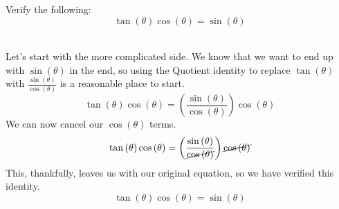 \documentclass{ximera}
\begin{document}
\begin{example}
Verify the following:\\
\[
\tan{(\theta)}\cos{(\theta)}=\sin{(\theta)}
\]
\\
\begin{explanation}
Let's start with the more complicated side. We know that we want to end up with $\sin{(\theta)}$ in the end, so using the Quotient identity to replace $\tan{(\theta)}$ with $\frac{\sin{(\theta)}}{\cos{(\theta)}}$ is a reasonable place to start.
\[
\tan{(\theta)}\cos{(\theta)}=\left(\frac{\sin{(\theta)}}{\cos{(\theta)}}\right)\cos{(\theta)}
\]
We can now cancel our $\cos{(\theta)}$ terms.
\[
\tan{(\theta)}\cos{(\theta)}=\left(\frac{\sin{(\theta)}}{\cancel{\cos{(\theta)}}}\right)\cancel{\cos{(\theta)}}
\]
This, thankfully, leaves us with our original equation, so we have verified this identity.
\[
\tan{(\theta)}\cos{(\theta)}=\sin{(\theta)}
\]
\end{explanation}
\end{example}
\end{document}
